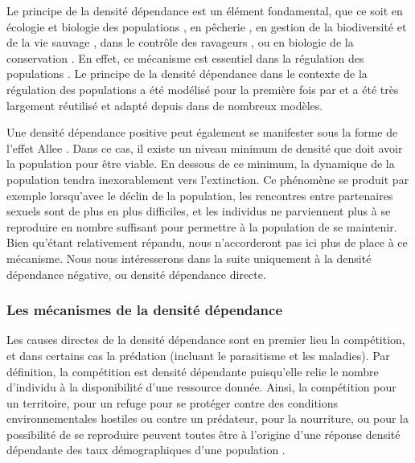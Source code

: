 Le principe de la densité dépendance est un élément fondamental, que ce soit en
écologie et biologie des populations \autocites{kingsland1995a}, en pêcherie
\autocites{rose2001a}, en gestion de la biodiversité et de la vie sauvage
\autocites{gordon2004a}, dans le contrôle des ravageurs \autocites{walde1988a},
ou en biologie de la conservation \autocites{ginzburg1990a}. En effet, ce mécanisme est
essentiel dans la régulation des populations \autocites{murdoch1994a,
turchin1990a}. Le principe de la densité dépendance dans le contexte de la
régulation des populations a été modélisé pour la première fois par
\textcite{verhulst1838a} et a été très largement réutilisé et adapté depuis dans
de nombreux modèles. 

Une densité dépendance positive peut également se manifester sous la forme de
l'effet Allee \autocites{allee1931animal,courchamp1999a}. Dans ce cas, il existe
un niveau minimum de densité que doit avoir la population pour être viable. En dessous de
ce minimum, la dynamique de la population tendra inexorablement vers
l'extinction. Ce phénomène se produit par exemple lorsqu'avec le déclin de la
population, les rencontres entre partenaires sexuels sont de plus en plus
difficiles, et les individus ne parviennent plus à se reproduire en nombre
suffisant pour permettre à la population de se maintenir. Bien qu'étant
relativement répandu, nous n'accorderont pas ici plus de place à ce mécanisme. Nous nous intéresserons dans
la suite uniquement à la densité dépendance négative, ou densité dépendance
directe. 

\subsubsection{Les mécanismes de la densité dépendance}

Les causes directes de la densité dépendance sont en premier lieu la
compétition, et dans certains cas la prédation (incluant le parasitisme et les
maladies). Par définition, la compétition est densité dépendante puisqu'elle
relie le nombre d'individu à la disponibilité d'une ressource donnée. Ainsi, la
compétition pour un territoire, pour un refuge pour se protéger contre des
conditions environnementales hostiles ou contre un prédateur, pour la
nourriture, ou pour la possibilité de se reproduire peuvent toutes être à
l'origine d'une réponse densité dépendante des taux démographiques d'une population
\autocites{keddy1989a,begon2009a}.

